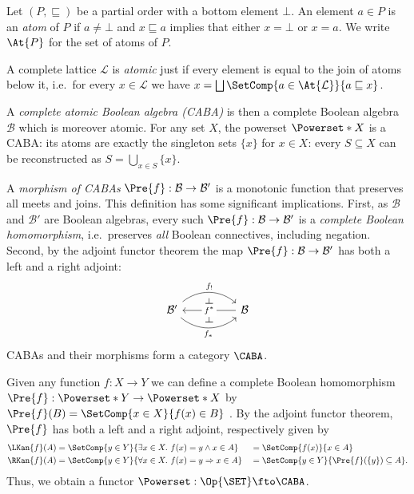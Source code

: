 \begin{definition}[Atom]
  Let $(P, \sqsubseteq)$ be a partial order with a bottom element $\bot$. An
  element $a \in P$ is an \emph{atom} of $P$ if $a \neq \bot$ and $x \sqsubseteq
  a$ implies that either $x = \bot$ or $x = a$. We write $\At{P}$ for the set of
  atoms of $P$.
\end{definition}

\begin{definition}
  A complete lattice $\mathcal{L}$ is \emph{atomic} just if every element is
  equal to the join of atoms below it, i.e.\ for every $x \in \mathcal{L}$ we
  have $x = \bigsqcup \SetComp{ a \in \At{\mathcal{L}}}{ a \sqsubseteq x }$.
\end{definition}

A \emph{complete atomic Boolean algebra (CABA)} is then a complete Boolean
algebra $\mathcal{B}$ which is moreover atomic. For any set $X$, the powerset $\Powerset*{X}$
is a CABA: its atoms are exactly the singleton sets $\{ x \}$ for $x \in X$:
every $S \subseteq X$ can be reconstructed as $S = \bigcup_{x \in S} \{ x \}$.

A \emph{morphism of CABAs} $\Pre{f} : \mathcal{B} \to \mathcal{B}'$ is
a monotonic function that preserves all meets and joins. This
definition has some significant implications. First, as $\mathcal{B}$
and $\mathcal{B}'$ are Boolean algebras, every such
$\Pre{f} : \mathcal{B} \to \mathcal{B}'$ is a \emph{complete Boolean
  homomorphism}, i.e.\ preserves \emph{all} Boolean connectives,
including negation. Second, by the adjoint functor theorem the map
$\Pre{f} : \mathcal{B} \to \mathcal{B}'$ has both a left and a right
adjoint:
\[
  \begin{tikzcd}[column sep=huge]
    \mathcal{B}' \arrow[r, bend left=40, "f_!"] \arrow[r, bend right=40, "f_*"'] & \mathcal{B} \arrow[l, "f^*" description] \arrow[phantom, from=1-1, to=1-2, "{\rotatebox[origin=c]{-90}{$\dashv$}}" pos=0.5, shift left=3.5, description] \arrow[phantom, from=1-1, to=1-2, "{\rotatebox[origin=c]{-90}{$\dashv$}}", pos=0.5, shift right=3.5, description]
  \end{tikzcd}
\]
CABAs and their morphisms form a category $\CABA$.

Given any function $f : X \to Y$ we can define a complete Boolean homomorphism
$\Pre{f} : \Powerset*{Y} \to \Powerset*{X}$ by $\Pre{f}(B) = \SetComp{ x \in X
}{ f(x) \in B}$ \cite{lawvere_1970,mellies_2016,kishida_2018}. By the adjoint
functor theorem, $\Pre{f}$ has both a left and a right adjoint, respectively
given by
\begin{alignat*}{2}
  \LKan{f}(A) &= \SetComp{ y \in Y }{\exists x \in X.\ f(x) = y \land x \in A }
  &&= \SetComp{ f(x) }{ x \in A } \\
  \RKan{f}(A) &= \SetComp{ y \in Y }{ \forall x \in X.\ f(x) = y \Rightarrow x \in A }
  &&= \SetComp { y \in Y }{ \Pre{f}(\{ y \}) \subseteq A }.
\end{alignat*}
Thus, we obtain a functor $\Powerset : \Op{\SET} \fto \CABA$.

